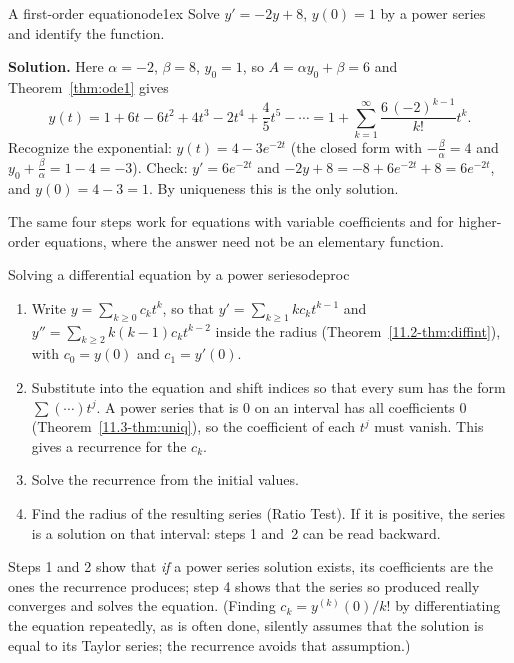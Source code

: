 \documentclass[11pt]{article}
\begin{document}
\begin{exmp}{A first-order equation}{ode1ex}
Solve $y'=-2y+8$, $y(0)=1$ by a power series and identify the function.

\textbf{Solution.} Here $\alpha=-2$, $\beta=8$, $y_0=1$, so $A=\alpha y_0+\beta=6$ and Theorem~\ref{thm:ode1} gives
\[
y(t)=1+6t-6t^2+4t^3-2t^4+\frac45t^5-\cdots=1+\sum_{k=1}^\infty\frac{6\,(-2)^{k-1}}{k!}t^k .
\]
Recognize the exponential: $y(t)=4-3e^{-2t}$ (the closed form with $-\frac\beta\alpha=4$ and $y_0+\frac\beta\alpha=1-4=-3$). Check: $y'=6e^{-2t}$ and $-2y+8=-8+6e^{-2t}+8=6e^{-2t}$, and $y(0)=4-3=1$. By uniqueness this is the only solution.
\end{exmp}

The same four steps work for equations with variable coefficients and for higher-order equations, where the answer need not be an elementary function.

\begin{proc}{Solving a differential equation by a power series}{odeproc}
\begin{enumerate}[nosep]
  \item Write $y=\sum_{k\ge0}c_kt^k$, so that $y'=\sum_{k\ge1}kc_kt^{k-1}$ and $y''=\sum_{k\ge2}k(k-1)c_kt^{k-2}$ inside the radius (Theorem~\ref{11.2-thm:diffint}), with $c_0=y(0)$ and $c_1=y'(0)$.
  \item Substitute into the equation and shift indices so that every sum has the form $\sum(\cdots)t^j$. A power series that is $0$ on an interval has all coefficients $0$ (Theorem~\ref{11.3-thm:uniq}), so the coefficient of each $t^j$ must vanish. This gives a recurrence for the $c_k$.
  \item Solve the recurrence from the initial values.
  \item Find the radius of the resulting series (Ratio Test). If it is positive, the series is a solution on that interval: steps 1 and~2 can be read backward.
\end{enumerate}
\end{proc}

Steps 1 and 2 show that \emph{if} a power series solution exists, its coefficients are the ones the recurrence produces; step 4 shows that the series so produced really converges and solves the equation. (Finding $c_k=y^{(k)}(0)/k!$ by differentiating the equation repeatedly, as is often done, silently assumes that the solution is equal to its Taylor series; the recurrence avoids that assumption.)
\end{document}
